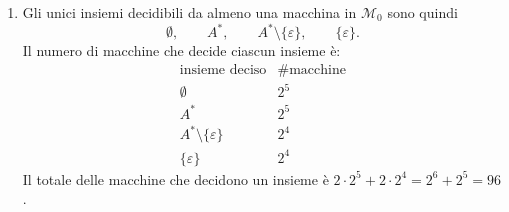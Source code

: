 \begin{sol}
\begin{enumerate}
\[\begin{tikzpicture}[
        scale=0.8, transform shape,
        >=stealth', shorten >=1pt, auto,
        every state/.style={circle, draw, fill=white, minimum size=0.8cm, inner sep=1pt}
    ]
    \draw[->] ([shift={(-0.7,0.7)}]q0.center) -- (q0);
    \draw[->] (q0) -- node {$\square/$} (qF0);
    \draw[->] (q0) -- node[swap] {$1/$} (qF1);
    \end{tikzpicture}
    \]
    decide l'insieme $A^*\setminus\{\varepsilon\}$.

    Poiché in ciascuna delle due transizioni si può scegliere liberamente il simbolo scritto e lo spostamento ($2\cdot 2$ scelte per transizione), per ciascuna riga della tabella esistono $2^4$ macchine.

    Se invece $T(q_0,1)=q_0$, la macchina termina comunque su ogni input (con $T(q_0,\square)=q_F^b$), e decide
    \[
    \begin{array}{c|c|c}
        T(q_0,\square) & T(q_0,1) & \text{insieme deciso} \\ \hline
        q_F^0 & q_0 & \emptyset \\
        q_F^1 & q_0 & A^*
    \end{array}
    \]
    Anche qui, contando come prima, ci sono $2^4$ macchine per ciascuna riga.

    \item Gli unici insiemi decidibili da almeno una macchina in $\mathcal M_0$ sono quindi
    \[
        \emptyset,\qquad A^*,\qquad A^*\setminus\{\varepsilon\},\qquad \{\varepsilon\}.
    \]
    Il numero di macchine che decide ciascun insieme è:
    \[
    \begin{array}{c|c}
        \text{insieme deciso} & \#\text{macchine} \\ \hline
        \emptyset & 2^5 \\
        A^* & 2^5 \\
        A^*\setminus\{\varepsilon\} & 2^4 \\
        \{\varepsilon\} & 2^4
    \end{array}
    \]
    Il totale delle macchine che decidono un insieme è $2\cdot 2^5+2\cdot 2^4=2^6+2^5=96$.
\end{enumerate}
\end{sol}